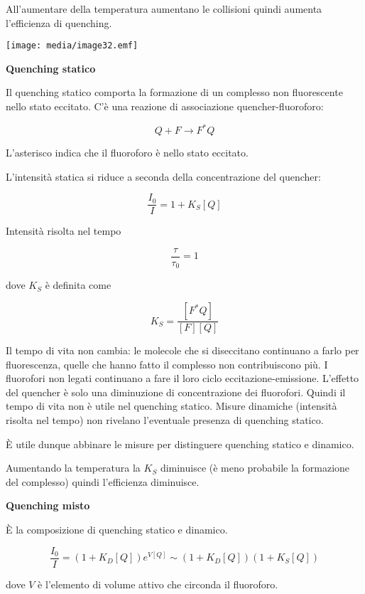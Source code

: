 All'aumentare della temperatura aumentano le collisioni quindi aumenta
l'efficienza di quenching.

\texttt{[image: media/image32.emf]}

\textbf{Quenching statico}

Il quenching statico comporta la formazione di un complesso non
fluorescente nello stato eccitato. C'è una reazione di associazione
quencher-fluoroforo:

\[Q + F \rightarrow F^{*}Q\]

L'asterisco indica che il fluoroforo è nello stato eccitato.

L'intensità statica si riduce a seconda della concentrazione del
quencher:

\[\frac{I_{0}}{I} = 1 + K_{S}\left\lbrack Q \right\rbrack\]

Intensità risolta nel tempo

\[\frac{\tau}{\tau_{0}} = 1\]

dove \(K_{S}\) è definita come

\[K_{S} = \frac{\left\lbrack F^{*}Q \right\rbrack}{\left\lbrack F \right\rbrack\left\lbrack Q \right\rbrack}\]

Il tempo di vita non cambia: le molecole che si diseccitano continuano a
farlo per fluorescenza, quelle che hanno fatto il complesso non
contribuiscono più. I fluorofori non legati continuano a fare il loro
ciclo eccitazione-emissione. L'effetto del quencher è solo una
diminuzione di concentrazione dei fluorofori. Quindi il tempo di vita
non è utile nel quenching statico. Misure dinamiche (intensità risolta
nel tempo) non rivelano l'eventuale presenza di quenching statico.

È utile dunque abbinare le misure per distinguere quenching statico e
dinamico.

Aumentando la temperatura la \(K_{S}\) diminuisce (è meno probabile la
formazione del complesso) quindi l'efficienza diminuisce.

\textbf{Quenching misto}

È la composizione di quenching statico e dinamico.

\[\frac{I_{0}}{I} = \left( 1 + K_{D}\left\lbrack Q \right\rbrack \right)e^{V\left\lbrack Q \right\rbrack} \sim \left( 1 + K_{D}\left\lbrack Q \right\rbrack \right)\left( 1 + K_{S}\left\lbrack Q \right\rbrack \right)\]

dove \(V\) è l'elemento di volume attivo che circonda il fluoroforo.

